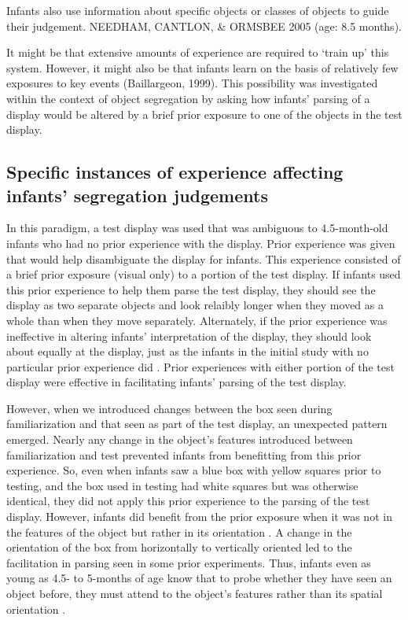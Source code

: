 Infants also use information about specific objects or
classes of objects to guide their judgement.  
NEEDHAM, CANTLON, \& ORMSBEE 2005 (age: 8.5 months).


It might be that extensive amounts of experience are required to
`train up' this system.  However, it might also be that infants learn
on the basis of relatively few exposures to key events (Baillargeon,
1999).  This possibility was investigated within the context of object
segregation by asking how infants' parsing of a display would be
altered by a brief prior exposure to one of the objects in the test
display.



\subsection{Specific instances of experience affecting infants' segregation judgements}

In this paradigm, a test display was used that was ambiguous to
4.5-month-old infants who had no prior experience with the display.
Prior experience was given that would help disambiguate the display
for infants.  This experience consisted of a brief prior exposure
(visual only) to a portion of the test display.  If infants used this
prior experience to help them parse the test display, they should see
the display as two separate objects and look relaibly longer when they
moved as a whole than when they move separately.  Alternately, if the
prior experience was ineffective in altering infants'
interpretation of the display, they should look about equally at the
display, just as the infants in the initial study with no particular
prior experience did \cite{needham98effects}.  Prior experiences
with either portion of the test display were effective in facilitating
infants' parsing of the test display.  

However, when we introduced changes between the box seen during
familiarization and that seen as part of the test display, an
unexpected pattern emerged.  Nearly any change in the object's
features introduced between familiarization and test prevented infants
from benefitting from this prior experience.  So, even when infants
saw a blue box with yellow squares prior to testing, and the box used
in testing had white squares but was otherwise identical, they did not
apply this prior experience to the parsing of the test display.
However, infants did benefit from the prior exposure when it was not
in the features of the object but rather in its orientation 
 \cite{needham01object}.  
A change in the orientation of the box from horizontally to
vertically oriented led to the facilitation in parsing seen in some
prior experiments.  Thus, infants even as young as 4.5- to 5-months of
age know that to probe whether they have seen an object before, they
must attend to the object's features rather than its spatial
orientation \cite{needham01object}.

